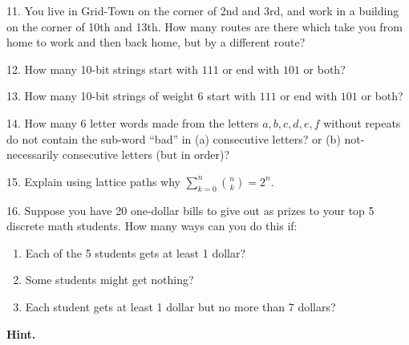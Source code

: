\documentclass[10pt,]{book}
\theoremstyle{plain}
\theoremstyle{definition}
\numberwithin{equation}{chapter}
\begin{document}
\begin{exerciselist}
\par\smallskip
\item[11.]\hypertarget{exercise-130}{}
            You live in Grid-Town on the corner of 2nd and 3rd, and work in a building on the corner of 10th and 13th. How many routes are there which take you from home to work and then back home, but by a different route?
\par\smallskip
\item[12.]\hypertarget{exercise-131}{}
            How many 10-bit strings start with \(111\) or end with \(101\) or both?
\par\smallskip
\item[13.]\hypertarget{exercise-132}{}
            How many 10-bit strings of weight 6 start with \(111\) or end with \(101\) or both?
\par\smallskip
\item[14.]\hypertarget{exercise-133}{}
            How many 6 letter words made from the letters \(a,b,c,d,e,f\) without repeats do not contain the sub-word ``bad'' in (a) consecutive letters? or (b) not-necessarily consecutive letters (but in order)?
\par\smallskip
\item[15.]\hypertarget{exercise-134}{}
            Explain using lattice paths why \(\sum_{k=0}^n {n \choose k} = 2^n\).
\par\smallskip
\item[16.]\hypertarget{exercise-135}{}
            Suppose you have 20 one-dollar bills to give out as prizes to your top 5 discrete math students. How many ways can you do this if:
          \leavevmode%
\begin{enumerate}[label=(\alph*)]
\item\hypertarget{li-454}{}
                Each of the 5 students gets at least 1 dollar?
\item\hypertarget{li-455}{}
                Some students might get nothing?
\item\hypertarget{li-456}{}
                Each student gets at least 1 dollar but no more than 7 dollars?
\end{enumerate}

\par\smallskip
\par\smallskip
\noindent\textbf{Hint.}\hypertarget{hint-9}{}\quad


\end{exerciselist}
\end{document}
